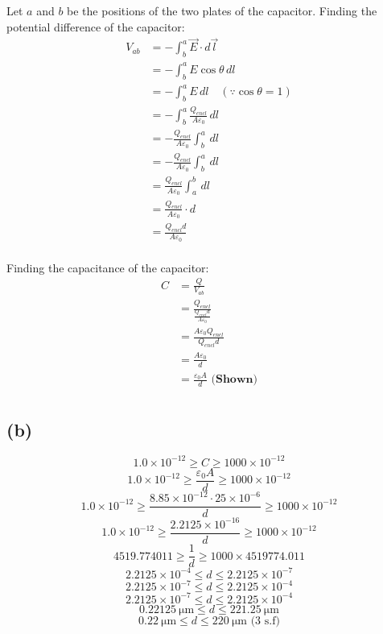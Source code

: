 \documentclass[11pt]{article}
\begin{document}
Let \(a\) and \(b\) be the positions of the two plates of the capacitor. Finding the potential difference of the capacitor:
\begin{align*}
V_{ab} &= - \int_b^a \vec{E} \cdot d \vec{l} \\
&= - \int_b^a E \cos \theta \, dl \\
&= - \int_b^a E \, dl \quad (\because \cos \theta = 1) \\
&= - \int_b^a \frac{Q_{encl}}{A \varepsilon_0} \, dl \\
&= - \frac{Q_{encl}}{A \varepsilon_0} \int_b^a \, dl \\
&= - \frac{Q_{encl}}{A \varepsilon_0} \int_b^a \, dl \\
&= \frac{Q_{encl}}{A \varepsilon_0} \int_a^b \, dl \\
&= \frac{Q_{encl}}{A \varepsilon_0} \cdot d \\
&= \frac{Q_{encl}d}{A \varepsilon_0} \\
\end{align*}

Finding the capacitance of the capacitor:
\begin{align*}
C &= \frac{Q}{V_{ab}} \\
&= \frac{Q_{encl}}{\frac{Q_{encl}d}{A \varepsilon_0}} \\
&= \frac{A \varepsilon_0 Q_{encl}}{Q_{encl} d} \\
&= \frac{A \varepsilon_0}{d} \\
&= \frac{\varepsilon_0 A}{d} \textbf{ (Shown)} \\
\end{align*}

\newpage
\subsection{(b)}
\label{sec:orgbe98ea0}
\[1.0 \times 10^{-12} \ge C \ge 1000 \times 10^{-12}\]
\[1.0 \times 10^{-12} \ge \frac{\varepsilon_0 A}{d} \ge 1000 \times 10^{-12}\]
\[1.0 \times 10^{-12} \ge \frac{8.85 \times 10^{-12} \cdot 25 \times 10^{-6}}{d} \ge 1000 \times 10^{-12}\]
\[1.0 \times 10^{-12} \ge \frac{2.2125 \times 10^{-16}}{d} \ge 1000 \times 10^{-12}\]
\[4519.774011 \ge \frac{1}{d} \ge 1000 \times 4519774.011\]
\[2.2125 \times 10^{-4} \le d \le 2.2125 \times 10^{-7}\]
\[2.2125 \times 10^{-7} \le d \le 2.2125 \times 10^{-4}\]
\[2.2125 \times 10^{-7} \le d \le 2.2125 \times 10^{-4}\]
\[\qty{0.22125}{\unit{\micro\metre}} \le d \le \qty{221.25}{\unit{\micro\metre}}\]
\[\qty{0.22}{\unit{\micro\metre}} \le d \le \qty{220}{\unit{\micro\metre}} \text{ (3 s.f)}\]
\end{document}
